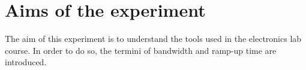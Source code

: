 \section{Aims of the experiment}
The aim of this experiment is to understand the tools used in the electronics lab course. In order to do so, the termini of bandwidth and ramp-up time are introduced.